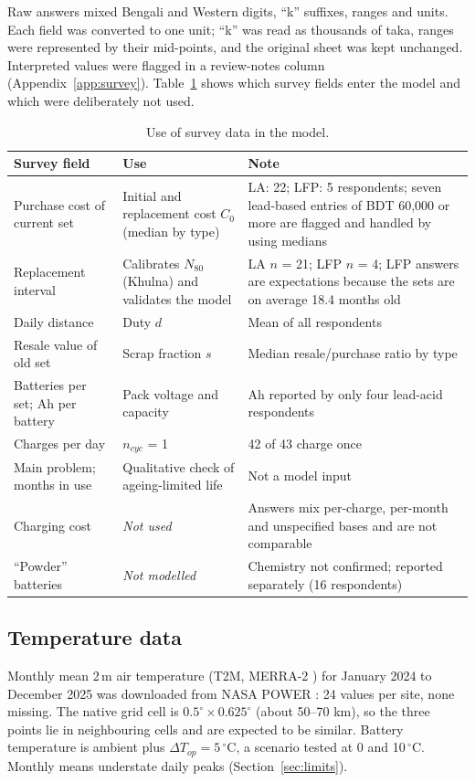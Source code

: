 \documentclass[11pt,a4paper]{article}
\newcommand{\nSurvey}{43}
\newcommand{\nLA}{22}
\newcommand{\replNLA}{21}
\newcommand{\nLFP}{5}
\newcommand{\replNLFP}{4}
\newcommand{\ageMeanLFP}{18.4}
\newcommand{\nPW}{16}
\newcommand{\onePerDay}{42}
\begin{document}
Raw answers mixed Bengali and Western digits, ``k'' suffixes, ranges and units. Each field was converted to one unit; ``k'' was read as thousands of taka, ranges were represented by their mid-points, and the original sheet was kept unchanged. Interpreted values were flagged in a review-notes column (Appendix~\ref{app:survey}). Table~\ref{tab:use} shows which survey fields enter the model and which were deliberately not used.
\begin{table}[t]
\caption{Use of survey data in the model.}
\label{tab:use}
\centering\footnotesize
\renewcommand{\arraystretch}{1.1}
\begin{tabular}{p{3.6cm}p{5.0cm}p{6.0cm}}
\hline
Survey field & Use & Note \\
\hline
Purchase cost of current set & Initial and replacement cost $C_0$ (median by type) & LA: \nLA{}; LFP: \nLFP{} respondents; seven lead-based entries of BDT 60{,}000 or more are flagged and handled by using medians \\
Replacement interval & Calibrates $N_{80}$ (Khulna) and validates the model & LA $n$ = \replNLA{}; LFP $n$ = \replNLFP{}; LFP answers are expectations because the sets are on average \ageMeanLFP{} months old \\
Daily distance & Duty $d$ & Mean of all respondents \\
Resale value of old set & Scrap fraction $s$ & Median resale/purchase ratio by type \\
Batteries per set; Ah per battery & Pack voltage and capacity & Ah reported by only four lead-acid respondents \\
Charges per day & $n_{cyc}$ = 1 & \onePerDay{} of \nSurvey{} charge once \\
Main problem; months in use & Qualitative check of ageing-limited life & Not a model input \\
Charging cost & \emph{Not used} & Answers mix per-charge, per-month and unspecified bases and are not comparable \\
``Powder'' batteries & \emph{Not modelled} & Chemistry not confirmed; reported separately (\nPW{} respondents) \\
\hline
\end{tabular}
\end{table}

\subsection{Temperature data}
Monthly mean 2\,m air temperature (T2M, MERRA-2 \cite{gelaro2017}) for January 2024 to December 2025 was downloaded from NASA POWER \cite{nasa_power}: 24 values per site, none missing. The native grid cell is $0.5^\circ\times0.625^\circ$ (about 50--70 km), so the three points lie in neighbouring cells and are expected to be similar. Battery temperature is ambient plus $\Delta T_{op}=5\,^\circ$C, a scenario tested at 0 and 10\,$^\circ$C. Monthly means understate daily peaks (Section~\ref{sec:limits}).
\end{document}
